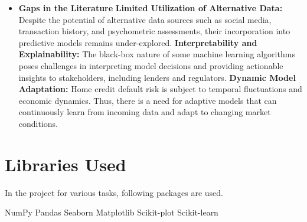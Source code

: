 \documentclass{josis}
\begin{document}
\begin{itemize}
\item\textbf{Gaps in the Literature}
\newline\textbf{Limited Utilization of Alternative Data:} Despite the potential of alternative data sources such as social media, transaction history, and psychometric assessments, their incorporation into predictive models remains under-explored.
\newline\textbf{Interpretability and Explainability:} The black-box nature of some machine learning algorithms poses challenges in interpreting model decisions and providing actionable insights to stakeholders, including lenders and regulators.
\newline\textbf{Dynamic Model Adaptation:} Home credit default risk is subject to temporal fluctuations and economic dynamics. Thus, there is a need for adaptive models that can continuously learn from incoming data and adapt to changing market conditions.
\end{itemize}

\section{Libraries Used}
In the project for various tasks, following packages are used.
\begin{python}
    NumPy
    Pandas
    Seaborn
    Matplotlib
    Scikit-plot
    Scikit-learn
\end{python}
\end{document}
